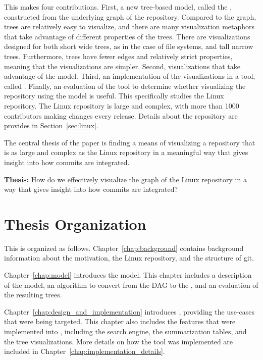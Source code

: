This \paper{} makes four contributions. First, a new tree-based model,
called the \mt{}, constructed from the underlying graph of the
repository. Compared to the graph, trees are relatively easy to
visualize, and there are many visualization metaphors that take
advantage of different properties of the trees. There are visualizations
designed for both short wide trees, as in the case of file systems, and
tall narrow trees. Furthermore, trees have fewer edges and relatively
strict properties, meaning that the visualizations are simpler. Second,
visualizations that take advantage of the \mt{} model. Third, an
implementation of the visualizations in a tool, called \tool{}. Finally,
an evaluation of the tool to determine whether visualizing the
repository using the model is useful. This \paper{} specifically studies
the Linux repository. The Linux repository is large and complex, with
more than 1000 contributors making changes every release. Details about
the repository are provides in Section~\ref{sec:linux}.

The central thesis of the paper is finding a means of visualizing a
repository that is as large and complex as the Linux repository in a
meaningful way that gives insight into how commits are integrated.

\begin{textbox}
  \textbf{Thesis:} How do we effectively visualize the graph of the
  Linux repository in a way that gives insight into how commits are
  integrated?
\end{textbox}

\section{Thesis Organization}\label{sec:thesis_organization}

This \paper{} is organized as follows. Chapter~\ref{chap:background}
contains background information about the motivation, the Linux
repository, and the structure of git.

Chapter~\ref{chap:model} introduces the \mt{} model. This chapter
includes a description of the model, an algorithm to convert from the
DAG to the \mt{}, and an evaluation of the resulting trees.

Chapter~\ref{chap:design_and_implementation} introduces \tool{},
providing the use-cases that were being targeted. This chapter also
includes the features that were implemented into \tool{}, including the
search engine, the summarization tables, and the tree visualizations.
More details on how the tool was implemented are included in
Chapter~\ref{chap:implementation_details}.


